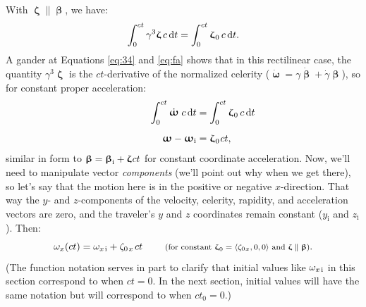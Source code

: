 \documentclass[12pt]{article}
\newcommand{\dd}[1]{\mathrm{d}#1}
\newcommand{\vvbeta}{\bm{\upbeta}}
\newcommand{\vvomega}{\bm{\upomega}}
\newcommand{\vvzeta}{\bm{\upzeta}}
\begin{document}
With $\vvzeta \parallel \vvbeta$, we have:
\begin{equation*}
\int_0^{ct} \gamma^3 \vvzeta \, c \, \dd t = \int_0^{ct} \vvzeta_{\mkern1mu 0} \, c \, \dd t .
\end{equation*}
A gander at Equations \ref{eq:34} and \ref{eq:fa} shows that in this rectilinear case, the quantity $\gamma^3 \vvzeta$ is the $ct$-derivative of the normalized celerity ($\dot{\vvomega} = \gamma \dot{\vvbeta} + \dot{\gamma} \vvbeta$), so for constant proper acceleration:
\begin{equation*}
\begin{split}
\qquad \qquad \int_0^{ct} \dot{\vvomega} \; c \, \dd t &= \int_0^{ct} \vvzeta_{\mkern1mu 0} \, c \, \dd t \\[5pt]
\vvomega - \vvomega_{ \textrm{i}} &= \vvzeta_{\mkern1mu 0} \mkern1mu ct ,
\end{split}
\end{equation*}
similar in form to $\vvbeta =  \vvbeta_{\textrm{i}} + \vvzeta \mkern1mu ct$ for constant coordinate acceleration. Now, we'll need to manipulate vector \emph{components} (we'll point out why when we get there), so let's say that the motion here is in the positive or negative $x$-direction. That way the $y$- and $z$-components of the velocity, celerity, rapidity, and acceleration vectors are zero, and the traveler's $y$ and $z$ coordinates remain constant ($y_{\textrm{i}}$ and $z_{\textrm{i}}$). Then:
\begin{equation}\label{eq:ce}
\omega_x (ct) = \omega_{x \mkern2mu \textrm{i}} + \zeta_{0 \mkern2mu x} \mkern2mu ct \qquad \textrm{\footnotesize{ (for constant $\vvzeta_{\mkern1mu 0} = \langle \zeta_{0 \mkern1mu x} , 0, 0 \rangle$ and $\vvzeta \parallel \vvbeta$)}}.
\end{equation}
(The function notation serves in part to clarify that initial values like $\omega_{x \mkern2mu \textrm{i}}$ in this section correspond to when $ct = 0$. In the next section, initial values will have the same notation but will correspond to when $ct_0 = 0$.)
\end{document}
